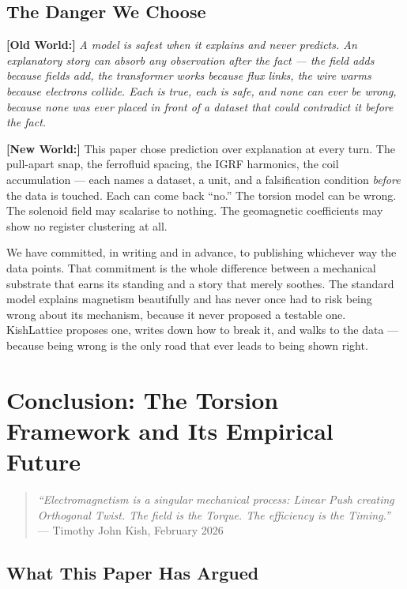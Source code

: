 \documentclass[11pt, letterpaper, openany]{book}
\newcommand{\oldworld}[1]{\noindent\textbf{\color{goldseal}[Old World:]}
  \textit{#1}\medskip}
\newcommand{\newworldcmd}[1]{\noindent\textbf{\color{kishblue}[New World:]}
  #1\medskip}
\begin{document}
\section{The Danger We Choose}
 
\oldworld{A model is safest when it explains and never predicts. An
explanatory story can absorb any observation after the fact --- the field
adds because fields add, the transformer works because flux links, the
wire warms because electrons collide. Each is true, each is safe, and none
can ever be wrong, because none was ever placed in front of a dataset that
could contradict it before the fact.}
 
\newworldcmd{This paper chose prediction over explanation at every turn.
The pull-apart snap, the ferrofluid spacing, the IGRF harmonics, the coil
accumulation --- each names a dataset, a unit, and a falsification condition
\emph{before} the data is touched. Each can come back ``no.'' The torsion
model can be wrong. The solenoid field may scalarise to nothing. The
geomagnetic coefficients may show no register clustering at all.
 
We have committed, in writing and in advance, to publishing whichever way
the data points. That commitment is the whole difference between a
mechanical substrate that earns its standing and a story that merely
soothes. The standard model explains magnetism beautifully and has never
once had to risk being wrong about its mechanism, because it never proposed
a testable one. KishLattice proposes one, writes down how to break it, and
walks to the data --- because being wrong is the only road that ever leads
to being shown right.}
 
\chapter{Conclusion: The Torsion Framework and Its Empirical Future}

\begin{quote}
\textit{``Electromagnetism is a singular mechanical process:
Linear Push creating Orthogonal Twist. The field is the Torque.
The efficiency is the Timing.''}\\[0.3em]
\hfill --- Timothy John Kish, February 2026
\end{quote}

\section{What This Paper Has Argued}
\end{document}
